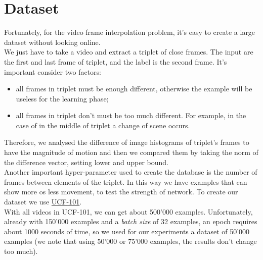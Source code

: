 \documentclass[11pt, a4paper]{article}
\begin{document}
	\section{Dataset}
	Fortunately, for the video frame interpolation problem, it's easy to create a large dataset without looking online.\\
	We just have to take a video and extract a triplet of close frames. The input are the first and last frame of triplet, and the label is the second frame. It's important consider two factors:
	\begin{itemize}
		\item all frames in triplet must be enough different, otherwise the example will be useless for the learning phase;
		\item all frames in triplet don't must be too much different. For example, in the case of in the middle of triplet a change of scene occurs. 
	\end{itemize}
	Therefore, we analysed the difference of image histograms of triplet's frames to have the magnitude of motion and then we compared them by taking the norm of the difference vector, setting lower and upper bound.\\
	Another important hyper-parameter used to create the database is the number of frames between elements of the triplet. In this way we have examples that can show more os less movement, to test the strength of network. To create our dataset we use \href{https://www.crcv.ucf.edu/data/UCF101.php}{UCF-101}.\\
	With all videos in UCF-101, we can get about 500'000 examples. Unfortunately, already with 150'000 examples and a \textit{batch size} of 32 examples, an epoch requires about 1000 seconds of time, so we used for our experiments a dataset of 50'000 examples (we note that using 50'000 or 75'000 examples, the results don't change too much).
	 
\end{document}
